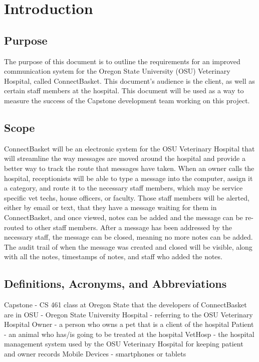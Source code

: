 \documentclass[onecolumn, draftclsnofoot,10pt, compsoc]{IEEEtran}
\begin{document}
\section{Introduction}

\subsection{Purpose}
The purpose of this document is to outline the requirements for an improved communication system for the Oregon State University (OSU) Veterinary Hospital, called ConnectBasket. 
This document's audience is the client, as well as certain staff members at the hospital. This document will be used as a way to measure the success of the Capstone development team working on this project. 


\subsection{Scope}
ConnectBasket will be an electronic system for the OSU Veterinary Hospital that will streamline the way messages are moved around the hospital and provide a better way to track the route that messages have taken. When an owner calls the hospital, receptionists will be able to type a message into the computer, assign it a category, and route it to the necessary staff members, which may be service specific vet techs, house officers, or faculty. Those staff members will be alerted, either by email or text, that they have a message waiting for them in ConnectBasket, and once viewed, notes can be added and the message can be re-routed to other staff members. After a message has been addressed by the necessary staff, the message can be closed, meaning no more notes can be added. The audit trail of when the message was created and closed will be visible, along with all the notes, timestamps of notes, and staff who added the notes.


\subsection{Definitions, Acronyms, and Abbreviations}
Capstone - CS 461 class at Oregon State that the developers of ConnectBasket are in 
OSU - Oregon State University
Hospital - referring to the OSU Veterinary Hospital
Owner - a person who owns a pet that is a client of the hospital
Patient - an animal who has/is going to be treated at the hospital 
VetHosp - the hospital management system used by the OSU Veterinary Hospital for keeping patient and owner records
Mobile Devices - smartphones or tablets
\end{document}

